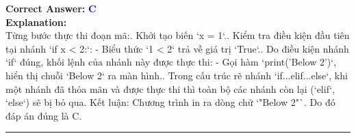 \documentclass[11pt,a4paper]{article}
\begin{document}
\begin{minipage}{\textwidth}
\noindent \textbf{Correct Answer:} \textcolor{blue}{\textbf{C}} \\[4pt]
\noindent \textbf{Explanation:}\\
Từng bước thực thi đoạn mã:. Khởi tạo biến `x = 1`.. Kiểm tra điều kiện đầu tiên tại nhánh `if x < 2:`:\newline
   - Biểu thức `1 < 2` trả về giá trị `True`.. Do điều kiện nhánh `if` đúng, khối lệnh của nhánh này được thực thi:\newline
   - Gọi hàm `print('Below 2')`, hiển thị chuỗi `Below 2` ra màn hình.. Trong cấu trúc rẽ nhánh `if...elif...else`, khi một nhánh đã thỏa mãn và được thực thi thì toàn bộ các nhánh còn lại (`elif`, `else`) sẽ bị bỏ qua.\newline
Kết luận: Chương trình in ra dòng chữ `"Below 2"`. Do đó đáp án đúng là C.
\end{minipage}
\vspace{0.8cm}
\hrule
\vspace{0.5cm}
\end{document}
